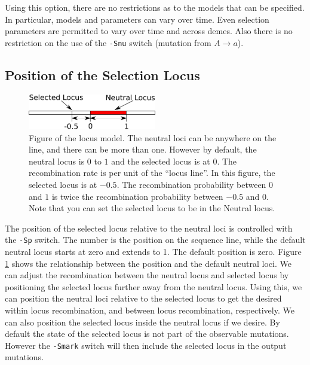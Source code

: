 \documentclass{article}
\begin{document}
Using this option, there are no restrictions as to the models that can be
specified. In particular, models and parameters can vary over time. Even
selection parameters are permitted to vary over time and across demes. Also
there is no restriction on the use of the {\tt -Snu} switch (mutation from $A
\to a$).


\subsection{Position of the Selection Locus}

\begin{figure}[htp!] 
\begin{center}
	\includegraphics[width=0.5\textwidth]{locus}
\end{center}
\caption{Figure of the locus model. The neutral loci can be
anywhere on the line, and there can be more than one. However
by default, the neutral locus is $0$ to $1$ and the selected locus
is at $0$. The recombination rate is per unit of the ``locus
line''. In this figure, the selected locus is at $-0.5$. The
recombination probability between $0$ and $1$ is twice the
recombination probability between $-0.5$ and $0$. Note that
you can set the selected locus to be in the Neutral locus.}
\label{fig:locus}
\end{figure}

The position of the selected locus relative to the neutral loci is controlled
with the {\tt -Sp} switch. The number is the position on the sequence line, while
the default neutral locus starts at zero and extends to 1. The default position
is zero. Figure \ref{fig:locus} shows the relationship between the position and
the default neutral loci. We can adjust the recombination between the neutral
locus and selected locus by positioning the selected locus further away from the
neutral locus. Using this, we can position the neutral loci relative to the
selected locus to get the desired within locus recombination, and between locus
recombination, respectively. We can also position the selected locus inside the
neutral locus if we desire. By default the state of the selected locus is not
part of the observable mutations. However the {\tt -Smark} switch will then
include the selected locus in the output mutations. 
\end{document}
